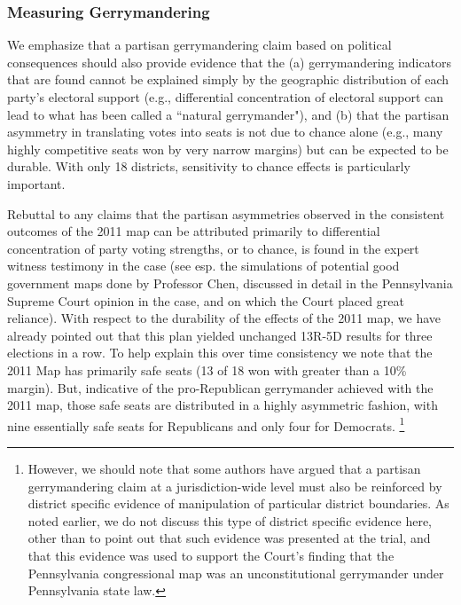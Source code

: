             \subsubsection*{Measuring Gerrymandering}
    We emphasize that a partisan gerrymandering claim based on political consequences should also provide evidence that the (a) gerrymandering indicators that are found cannot be explained simply by the geographic distribution of each party’s electoral support (e.g., differential concentration of electoral support can lead to what has been called a ``natural gerrymander"), and (b) that the partisan asymmetry in translating votes into seats is not due to chance alone (e.g., many highly competitive seats won by very narrow margins) but can be expected to be durable. With only 18 districts, sensitivity to chance effects is particularly important. 
\par
    Rebuttal to any claims that the partisan asymmetries observed in the consistent outcomes of the 2011 map can be attributed primarily to differential concentration of party voting strengths, or to chance, is found in the expert witness testimony in the case (see esp. the simulations of potential good government maps done by Professor Chen, discussed in detail in the Pennsylvania Supreme Court opinion in the case, and on which the Court placed great reliance). With respect to the durability of the effects of the 2011 map, we have already pointed out that this plan yielded unchanged 13R-5D results for three elections in a row. To help explain this over time consistency we note that the 2011 Map has primarily safe seats (13 of 18 won with greater than a 10\% margin). But, indicative of the pro-Republican gerrymander achieved with the 2011 map, those safe seats are distributed in a highly asymmetric fashion, with nine essentially safe seats for Republicans and only four for Democrats.
        \footnote{However, we should note that some authors \citep[e.g.,][]{Grofman2019_ELJ} have argued that a partisan gerrymandering claim at a jurisdiction-wide level must also be reinforced by district specific evidence of manipulation of particular district boundaries. As noted earlier, we do not discuss this type of district specific evidence here, other than to point out that such evidence was presented at the trial, and that this evidence was used to support the Court’s finding that the Pennsylvania congressional map was an unconstitutional gerrymander under Pennsylvania state law.}
